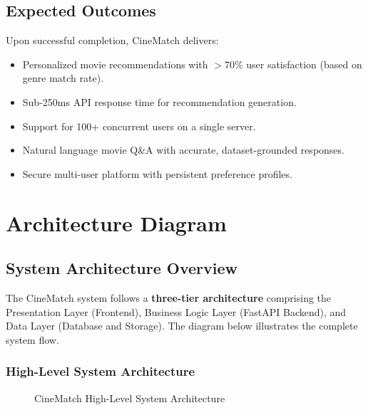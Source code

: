 \documentclass[12pt,a4paper]{report}
\begin{document}
\section{Expected Outcomes}

Upon successful completion, CineMatch delivers:

\begin{itemize}
    \item Personalized movie recommendations with $>$70\% user satisfaction (based on genre match rate).
    \item Sub-250ms API response time for recommendation generation.
    \item Support for 100+ concurrent users on a single server.
    \item Natural language movie Q\&A with accurate, dataset-grounded responses.
    \item Secure multi-user platform with persistent preference profiles.
\end{itemize}

\chapter{Architecture Diagram}

\section{System Architecture Overview}

The CineMatch system follows a \textbf{three-tier architecture} comprising the Presentation Layer (Frontend), Business Logic Layer (FastAPI Backend), and Data Layer (Database and Storage). The diagram below illustrates the complete system flow.

\subsection{High-Level System Architecture}

\begin{figure}[H]
\centering
\caption{CineMatch High-Level System Architecture}
\label{fig:system_arch}
\end{figure}
\end{document}
